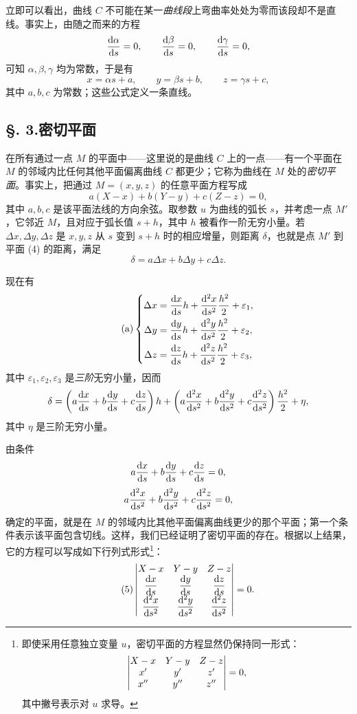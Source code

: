立即可以看出，曲线 \(C\) 不可能在某一\emph{曲线段}上弯曲率处处为零而该段却不是直线。事实上，由随之而来的方程
\[
\frac{\mathrm{d}\alpha}{\mathrm{d} s}=0,\qquad \frac{\mathrm{d}\beta}{\mathrm{d} s}=0,\qquad \frac{\mathrm{d}\gamma}{\mathrm{d} s}=0,
\]
可知 \(\alpha,\beta,\gamma\) 均为常数，于是有
\[
x=\alpha s+a,\qquad y=\beta s+b,\qquad z=\gamma s+c,
\]
其中 \(a,b,c\) 为常数；这些公式定义一条直线。

\subsection*{§. 3.\quad 密切平面}
在所有通过一点 \(M\) 的平面中——这里说的是曲线 \(C\) 上的一点——有一个平面在 \(M\) 的邻域内比任何其他平面偏离曲线 \(C\) 都更少；它称为曲线在 \(M\) 处的\emph{密切平面}。事实上，把通过 \(M=(x,y,z)\) 的任意平面方程写成
\begin{equation}\tag{4}
a(X-x)+b(Y-y)+c(Z-z)=0,
\end{equation}
其中 \(a,b,c\) 是该平面法线的方向余弦。取参数 \(u\) 为曲线的弧长 \(s\)，并考虑一点 \(M'\)，它邻近 \(M\)，且对应于弧长值 \(s+h\)，其中 \(h\) 被看作一阶无穷小量。若 \(\Delta x,\Delta y,\Delta z\) 是 \(x,y,z\) 从 \(s\) 变到 \(s+h\) 时的相应增量，则距离 \(\delta\)，也就是点 \(M'\) 到平面 (4) 的距离，满足
\[
\delta=a\Delta x+b\Delta y+c\Delta z.
\]

现在有
\begin{equation}\tag{a}
\left\{
\begin{aligned}
\Delta x&=\frac{\mathrm{d} x}{\mathrm{d} s}h+\frac{\mathrm{d}^2x}{\mathrm{d} s^2}\frac{h^2}{2}+\varepsilon_1,\\
\Delta y&=\frac{\mathrm{d} y}{\mathrm{d} s}h+\frac{\mathrm{d}^2y}{\mathrm{d} s^2}\frac{h^2}{2}+\varepsilon_2,\\
\Delta z&=\frac{\mathrm{d} z}{\mathrm{d} s}h+\frac{\mathrm{d}^2z}{\mathrm{d} s^2}\frac{h^2}{2}+\varepsilon_3,
\end{aligned}
\right.
\end{equation}
其中 \(\varepsilon_1,\varepsilon_2,\varepsilon_3\) 是\emph{三阶}无穷小量，因而
\[
\delta=\left(a\frac{\mathrm{d} x}{\mathrm{d} s}+b\frac{\mathrm{d} y}{\mathrm{d} s}+c\frac{\mathrm{d} z}{\mathrm{d} s}\right)h+
\left(a\frac{\mathrm{d}^2x}{\mathrm{d} s^2}+b\frac{\mathrm{d}^2y}{\mathrm{d} s^2}+c\frac{\mathrm{d}^2z}{\mathrm{d} s^2}\right)\frac{h^2}{2}+\eta,
\]
其中 \(\eta\) 是三阶无穷小量。

由条件
\[
a\frac{\mathrm{d} x}{\mathrm{d} s}+b\frac{\mathrm{d} y}{\mathrm{d} s}+c\frac{\mathrm{d} z}{\mathrm{d} s}=0,
\]
\[
a\frac{\mathrm{d}^2x}{\mathrm{d} s^2}+b\frac{\mathrm{d}^2y}{\mathrm{d} s^2}+c\frac{\mathrm{d}^2z}{\mathrm{d} s^2}=0,
\]
确定的平面，就是在 \(M\) 的邻域内比其他平面偏离曲线更少的那个平面；第一个条件表示该平面包含切线。这样，我们已经证明了密切平面的存在。根据以上结果，它的方程可以写成如下行列式形式\footnote{即使采用任意独立变量 \(u\)，密切平面的方程显然仍保持同一形式：
\[
\left|\begin{matrix}X-x & Y-y & Z-z\\ x' & y' & z'\\ x'' & y'' & z''\end{matrix}\right|=0,
\]
其中撇号表示对 \(u\) 求导。}：
\begin{equation}\tag{5}
\left|\begin{matrix}X-x & Y-y & Z-z\\
\dfrac{\mathrm{d} x}{\mathrm{d} s} & \dfrac{\mathrm{d} y}{\mathrm{d} s} & \dfrac{\mathrm{d} z}{\mathrm{d} s}\\
\dfrac{\mathrm{d}^2x}{\mathrm{d} s^2} & \dfrac{\mathrm{d}^2y}{\mathrm{d} s^2} & \dfrac{\mathrm{d}^2z}{\mathrm{d} s^2}\end{matrix}\right|=0.
\end{equation}


